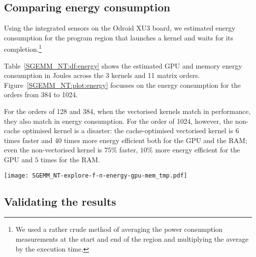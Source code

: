 \documentclass{acm_proc_article-sp} %
\begin{document}
\subsection{Comparing energy consumption}

Using the integrated sensors on the Odroid XU3 board, we estimated energy
consumption for the program region that launches a kernel and waits for its
completion.\footnote{We used a rather crude method of averaging the power
consumption measurements at the start and end of the region and multiplying the
average by the execution time.}

Table~\ref{SGEMM_NT:df:energy} shows the estimated GPU and memory energy
consumption in Joules across the 3 kernels and 11 matrix orders.
%
Figure~\ref{SGEMM_NT:plot:energy} focusses on the energy consumption for the
orders from 384 to 1024.

For the orders of 128 and 384, when the vectorised kernels match in
performance, they also match in energy consumption.
%
For the order of 1024, however, the non-cache optimised kernel is a disaster:
%
the cache-optimised vectorised kernel is $6$ times faster and $40$ times more
energy efficient both for the GPU and the RAM;
%
even the non-vectorised kernel is $75\%$ faster, $10\%$ more energy efficient
for the GPU and $5$ times for the RAM.

\begin{table*}
  \centering
  \caption{\label{SGEMM_NT:df:energy}The GPU \& memory energy consumption of 3 SGEMM NT kernels: {\tt pandas} DataFrame with raw results.}
  
\end{table*}

\begin{figure*}
  \texttt{[image: SGEMM\_NT-explore-f-n-energy-gpu-mem\_tmp.pdf]}
  \caption{The GPU \& memory energy consumption of 3 SGEMM NT kernels: {\tt matplotlib} bar plot.}
  \label{SGEMM_NT:plot:energy}
\end{figure*}


\subsection{Validating the results}
\label{sec:validating}
\end{document}
